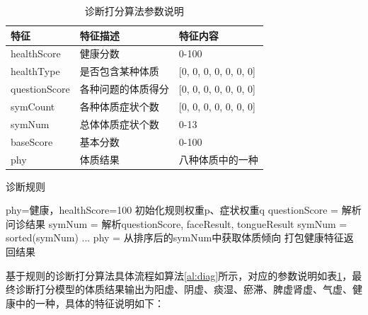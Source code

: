 \begin{table}[h]
    \caption{诊断打分算法参数说明}
    \begin{center}
        \begin{tabular}{lll}
            \toprule
            特征 & 特征描述 & 特征内容 \\ 
            \midrule
            healthScore & 健康分数 & 0-100 \\
            healthType & 是否包含某种体质 & {[}0, 0, 0, 0, 0, 0, 0{]} \\ 
            questionScore & 各种问题的体质得分 & {[}0, 0, 0, 0, 0, 0, 0{]} \\
            symCount & 各种体质症状个数 & {[}0, 0, 0, 0, 0, 0, 0{]} \\
            symNum & 总体体质症状个数 & 0-13 \\
            baseScore & 基本分数 & 0-100 \\
            phy & 体质结果 & 八种体质中的一种\\
            \bottomrule
        \end{tabular}
    \end{center}
    \label{tab:diag-feature}
\end{table}

\begin{algorithm}[htbp]
\caption{诊断规则}%
\label{al:diag}
\LinesNumbered %
phy=健康，healthScore=100\;
初始化规则权重p、症状权重q\;
questionScore = 解析问诊结果\;
symNum = 解析questionScore, faceResult, tongueResult\;
symNum = sorted(symNum)\;
...\;
phy = 从排序后的symNum中获取体质倾向\;
打包健康特征返回结果\;
\end{algorithm}

基于规则的诊断打分算法具体流程如算法\ref{al:diag}所示，对应的参数说明如表\ref{tab:diag-feature}，最终诊断打分模型的体质结果输出为阳虚、阴虚、痰湿、瘀滞、脾虚肾虚、气虚、健康中的一种，具体的特征说明如下：


